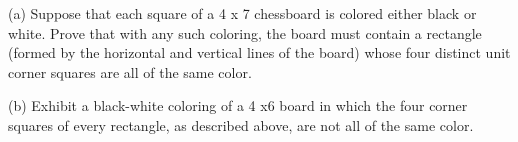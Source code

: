 (a) Suppose that each square of a 4 x 7 chessboard is colored either black or white. Prove that with any such coloring, the board must contain a rectangle (formed by the horizontal and vertical lines of the board) whose four distinct unit corner squares are all of the same color.

(b) Exhibit a black-white coloring of a 4 x6 board in which the four corner squares of every rectangle, as described above, are not all of the same color.